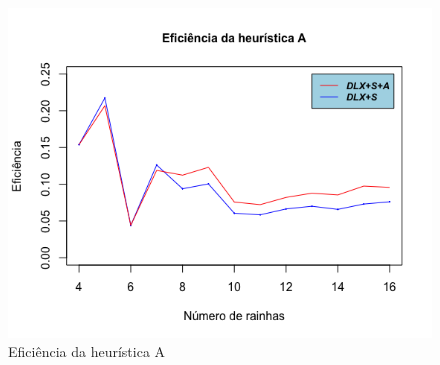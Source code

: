 \documentclass{article}
\begin{document}
\begin{figure}
  \includegraphics[width=\linewidth]{heuristic_a_efficiency.png}
  \caption{Eficiência da heurística A}
  \label{fig:heuristic_a}
\end{figure}
\end{document}
